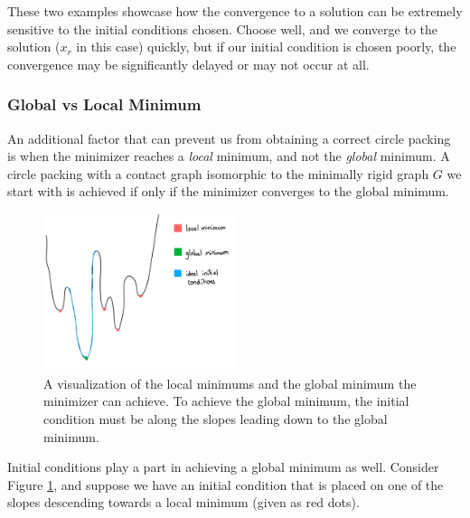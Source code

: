 \vspace{-4mm}
\begin{flushleft}
These two examples showcase how the convergence to a solution can be extremely sensitive to the initial conditions chosen. Choose well, and we converge to the solution ($x_r$ in this case) quickly, but if our initial condition is chosen poorly, the convergence may be significantly delayed or may not occur at all.
\end{flushleft}

\subsubsection{Global vs Local Minimum}

\begin{flushleft}
An additional factor that can prevent us from obtaining a correct circle packing is when the minimizer reaches a \textit{local} minimum, and not the \textit{global} minimum. A circle packing with a contact graph isomorphic to the minimally rigid graph $G$ we start with is achieved if only if the minimizer converges to the global minimum. 
\end{flushleft}

\begin{figure}[htbp]
    \centering
    \includegraphics[width = 0.5\textwidth]{Chapter 4/11. energy.png}
    \caption{A visualization of the local minimums and the global minimum the minimizer can achieve. To achieve the global minimum, the initial condition must be along the slopes leading down to the global minimum.}
    \label{fig4: minimum}
\end{figure}

\vspace{-4mm}
\begin{flushleft}
Initial conditions play a part in achieving a global minimum as well. Consider Figure \ref{fig4: minimum}, and suppose we have an initial condition that is placed on one of the slopes descending towards a local minimum (given as red dots). 
\end{flushleft}


